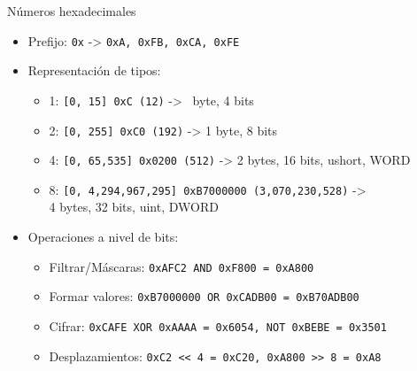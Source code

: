 \begin{frame}{Números hexadecimales}
    \begin{itemize}
        \item<1-> Prefijo: \texttt{0x} -> \texttt{0xA, 0xFB, 0xCA, 0xFE}

        \item<2-> Representación de tipos:
        \begin{itemize}
            \footnotesize
            \item<3-> 1: \texttt{[0, 15] 0xC (12)} -> \textonehalf~byte, 4 bits
            \item<4-> 2: \texttt{[0, 255] 0xC0 (192)} -> 1 byte, 8 bits
            \item<5-> 4: \texttt{[0, 65,535] 0x0200 (512)} -> 2 bytes, 16 bits, ushort, WORD
            \item<6-> 8: \texttt{[0, 4,294,967,295] 0xB7000000 (3,070,230,528)} -> \\ 4 bytes, 32 bits, uint, DWORD
        \end{itemize}
        \normalsize

        \item<7-> Operaciones a nivel de bits:
        \begin{itemize}
            \footnotesize
            \item<9-> Filtrar/Máscaras: \texttt{0xAFC2 AND 0xF800 = 0xA800}
            \item<10-> Formar valores: \texttt{0xB7000000 OR 0xCADB00 = 0xB70ADB00}
            \item<11-> Cifrar: \texttt{0xCAFE XOR 0xAAAA = 0x6054, NOT 0xBEBE = 0x3501}
            \item<12-> Desplazamientos: \texttt{0xC2 << 4 = 0xC20, 0xA800 >> 8 = 0xA8}
        \end{itemize}
    \end{itemize}
\end{frame}



